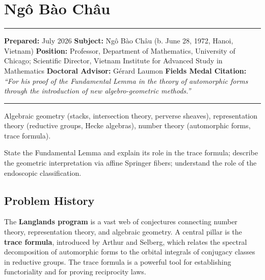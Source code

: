 \chapter{Ngô Bào Châu}\label{ch2010ngobaochau:nguxf4-buxe0o-chuxe2u-fields-medal-2010-a-comprehensive-report-on-his-work-and-impact}

\begin{center}\rule{0.5\linewidth}{0.5pt}\end{center}

\textbf{Prepared:} July 2026 \textbf{Subject:} Ngô Bào Châu (b. June 28, 1972, Hanoi, Vietnam) \textbf{Position:} Professor, Department of Mathematics, University of Chicago; Scientific Director, Vietnam Institute for Advanced Study in Mathematics \textbf{Doctoral Advisor:} Gérard Laumon \textbf{Fields Medal Citation:} \emph{``For his proof of the Fundamental Lemma in the theory of automorphic forms through the introduction of new algebro-geometric methods.''}

\begin{center}\rule{0.5\linewidth}{0.5pt}\end{center}

\begin{prereqs} Algebraic geometry (stacks, intersection theory, perverse sheaves), representation theory (reductive groups, Hecke algebras), number theory (automorphic forms, trace formula). \end{prereqs}

\begin{objectives} State the Fundamental Lemma \cite{ngo2010} and explain its role in the trace formula; describe the geometric interpretation via affine Springer fibers; understand the role of the endoscopic classification. \end{objectives}

\section{Problem History}\label{ch2010ngobaochau:problem-history}

The \textbf{Langlands program} is a vast web of conjectures connecting number theory, representation theory, and algebraic geometry. A central pillar is the \textbf{trace formula}, introduced by Arthur and Selberg, which relates the spectral decomposition of automorphic forms to the orbital integrals of conjugacy classes in reductive groups. The trace formula is a powerful tool for establishing functoriality and for proving reciprocity laws.

